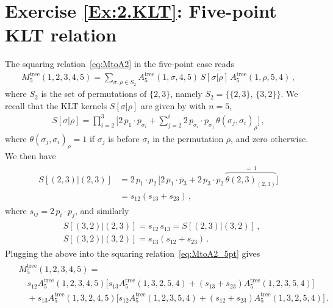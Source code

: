 \section*{Exercise \ref{Ex:2.KLT}: Five-point KLT relation}
\label{Sol:2.KLT}
%
The squaring relation~\eqref{eq:MtoA2} in the five-point case reads
\begin{align}  \label{eq:MtoA2_5pt}
M_{5}^{\text{tree}}(1,2,3,4,5) = \sum_{\sigma,\rho\in S_{2}} A_{5}^{\text{tree}}(1,\sigma,4,5)
\, S[\sigma|\rho] \, A_{5}^{\text{tree}}(1,\rho,5,4) \,,
\end{align}
where $S_2$ is the set of permutations of $\{2,3\}$, namely $S_2 = \bigr\{ \{2,3\}, \, \{3,2\} \bigl\}$. 
We recall that the KLT kernels $S[\sigma|\rho]$ are given by  with $n=5$,
\begin{align}
S[\sigma|\rho] = \prod_{i=2}^{3} \biggl[ 
2 \, p_{1}\cdot p_{\sigma_{i}} + \sum_{j=2}^{i} 2 \, p_{\sigma_{i}}\cdot p_{\sigma_{j}}\, \theta(\sigma_{j},
\sigma_{i})_{\rho}
\biggr] \,,
\end{align}
where $\theta(\sigma_{j}, \sigma_{i})_{\rho}=1$ if $\sigma_{j}$ is before $\sigma_{i}$ in the permutation $\rho$,
and zero otherwise. We then have
\begin{align} \begin{aligned}
S\left[(2,3)|(2,3)\right] & = 2 \, p_1 \cdot p_2 \, \bigl[ 2 \, p_1 \cdot p_3 + 2 \, p_3 \cdot p_2 \, \overbrace{\theta(2,3)_{(2,3)}}^{= \, 1} \bigr] \\
& = s_{12} ( s_{13} + s_{23} ) \,,
\end{aligned} \end{align}
where $s_{ij} = 2 \, p_i \cdot p_j$, and similarly
\begin{align} \begin{aligned}
& S\left[(3,2)|(2,3)\right] = s_{12} \, s_{13} = S\left[(2,3)|(3,2)\right]  \,, \\ 
& S\left[(3,2)|(3,2)\right] = s_{13} (s_{12}+s_{23}) \,.
\end{aligned} \end{align}
Plugging the above into the squaring relation~\eqref{eq:MtoA2_5pt} gives
\begin{align} \label{eq:M5KLT1} \begin{aligned}
& M_{5}^{\text{tree}}(1,2,3,4,5) = \\
 & \quad s_{12} A_5^{\text{tree}}(1,2,3,4,5) \bigl[ s_{13} A^{\text{tree}}_5(1,3,2,5,4) + (s_{13}+s_{23}) A^{\text{tree}}_5(1,2,3,5,4) \bigr]  \\
 & \quad + s_{13} A_5^{\text{tree}}(1,3,2,4,5) \bigl[ s_{12} A_5^{\text{tree}}(1,2,3,5,4) + (s_{12}+s_{23}) A_5^{\text{tree}}(1,3,2,5,4) \bigr] \,.
\end{aligned} \end{align}
